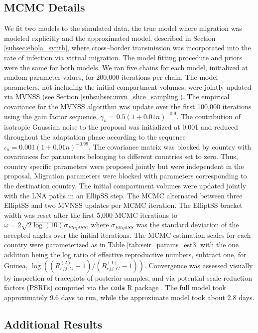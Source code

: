\newpage
\subsection{MCMC Details}
\label{subsec:ebola_synth_mcmc}
We fit two models to the simulated data, the true model where migration was modeled explicitly and the approximated model, described in Section \ref{subsec:ebola_synth}, where cross--border transmission was incorporated into the rate of infection via virtual migration. The model fitting procedure and priors were the same for both models. We ran five chains for each model, initialized at random parameter values, for 200,000 iterations per chain. The model parameters, not including the initial compartment volumes, were jointly updated via MVNSS (see Section \ref{subsubsec:mvn_slice_sampling}). The empirical covariance for the MVNSS algorithm was update over the first 100,000 iterations using the gain factor sequence, $\gamma_n = 0.5(1 + 0.01n)^{-0.9}$. The contribution of isotropic Gaussian noise to the proposal was initialized at 0.001 and reduced throughout the adaptation phase according to the sequence $ \iota_n = 0.001(1 + 0.01n)^{-0.99} $. The covariance matrix was blocked by country with covariances for parameters belonging to different countries set to zero. Thus, country specific parameters were proposed jointly but were independent in the proposal. Migration parameters were blocked with parameters corresponding to the destination country. The initial compartment volumes were updated jointly with the LNA paths in an EllipSS step. The MCMC alternated between three ElliptSS and two MVNSS updates per MCMC iteration. The ElliptSS bracket width was reset after the first 5,000 MCMC iterations to $ \omega = 2\sqrt{2\log(10)}\sigma_{ElliptSS}$, where $ \sigma_{ElliptSS} $ was the standard deviation of the accepted angles over the initial iterations. The MCMC estimation scales for each country were parameterized as in Table \ref{tab:seir_params_est3} with the one addition being the log ratio of effective reproductive numbers, subtract one, for Guinea, $ \log\left ((R_{eff,G}^{(2)}-1)/(R_{eff,G}^{(1)}-1)\right ) $. Convergence was assessed visually by inspection of traceplots of posterior samples, and via potential scale reduction factors (PSRFs) \cite{brooks1998general} computed via the \texttt{coda} R package \cite{codapackage}. The full model took approximately 9.6 days to run, while the approximate model took about 2.8 days. 

\subsection{Additional Results}
\label{subsec:ebola_synth_supplement}


